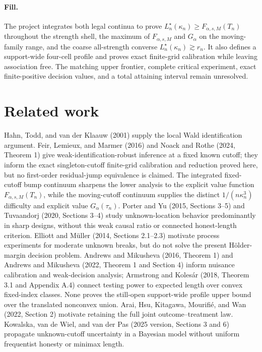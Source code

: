 \documentclass{article}
\begin{document}
\paragraph{Fill.} The project integrates both legal continua to prove \(L_n^\star(\kappa_n)\ge F_{\alpha,s,M}(T_n)\) throughout the strength shell, the maximum of \(F_{\alpha,s,M}\) and \(G_\alpha\) on the moving-family range, and the coarse all-strength converse \(L_n^\star(\kappa_n)\gtrsim r_n\). It also defines a support-wide four-cell profile and proves exact finite-grid calibration while leaving association free. The matching upper frontier, complete critical experiment, exact finite-positive decision values, and a total attaining interval remain unresolved.

\section{Related work}

Hahn, Todd, and van der Klaauw (2001) supply the local Wald identification argument. Feir, Lemieux, and Marmer (2016) and Noack and Rothe (2024, Theorem 1) give weak-identification-robust inference at a fixed known cutoff; they inform the exact singleton-cutoff finite-grid calibration and reduction proved here, but no first-order residual-jump equivalence is claimed. The integrated fixed-cutoff bump continuum sharpens the lower analysis to the explicit value function \(F_{\alpha,s,M}(T_n)\), while the moving-cutoff continuum supplies the distinct \(1/(n\kappa_n^3)\) difficulty and explicit value \(G_\alpha(\tau_n)\). Porter and Yu (2015, Sections 3--5) and Tuvaandorj (2020, Sections 3--4) study unknown-location behavior predominantly in sharp designs, without this weak causal ratio or connected honest-length criterion. Elliott and M{\"u}ller (2014, Sections 2.1--2.3) motivate process experiments for moderate unknown breaks, but do not solve the present H{\"o}lder-margin decision problem. Andrews and Mikusheva (2016, Theorem 1) and Andrews and Mikusheva (2022, Theorem 1 and Section 4) inform nuisance calibration and weak-decision analysis; Armstrong and Koles{\'a}r (2018, Theorem 3.1 and Appendix A.4) connect testing power to expected length over convex fixed-index classes. None proves the still-open support-wide profile upper bound over the translated nonconvex union. Arai, Hsu, Kitagawa, Mourifi{\'e}, and Wan (2022, Section 2) motivate retaining the full joint outcome--treatment law. Kowalska, van de Wiel, and van der Pas (2025 version, Sections 3 and 6) propagate unknown-cutoff uncertainty in a Bayesian model without uniform frequentist honesty or minimax length.
\end{document}
